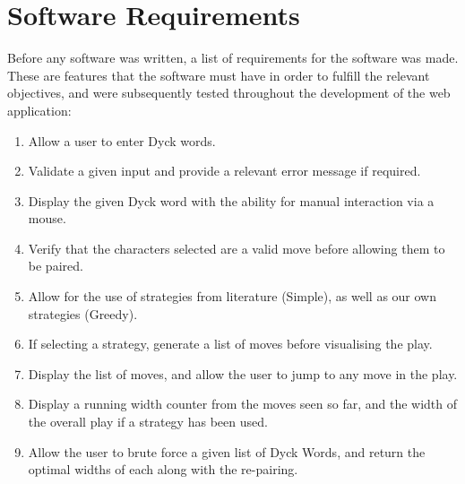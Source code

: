 \section{Software Requirements}
Before any software was written, a list of requirements for the software was made. These are features that the software must have in order to fulfill the relevant objectives, and were subsequently tested throughout the development of the web application:
\begin{enumerate}
    \label{softwareReqs}
    \item Allow a user to enter Dyck words.
    \item Validate a given input and provide a relevant error message if required.
    \item Display the given Dyck word with the ability for manual interaction via a mouse.
    \item Verify that the characters selected are a valid move before allowing them to be paired.
    \item Allow for the use of strategies from literature (Simple), as well as our own strategies (Greedy).
    \item If selecting a strategy, generate a list of moves before visualising the play.
    \item Display the list of moves, and allow the user to jump to any move in the play.
    \item Display a running width counter from the moves seen so far, and the width of the overall play if a strategy has been used.
    \item Allow the user to brute force a given list of Dyck Words, and return the optimal widths of each along with the re-pairing.
\end{enumerate}
